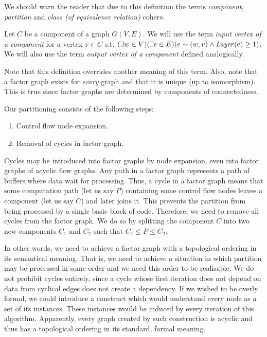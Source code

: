 \begin{rem} 
  We should warn the reader that due to this definition the terms \emph{component}, \emph{partition} and \emph{class (of equivalence relation)} cohere.
\end{rem}

  Let $C$ be a component of a graph $G(V,E)$. We will use the term \emph{input vertex of a component} for a vertex $v \in C$ s.t. $(\exists w \in V)(\exists e \in E)( e \sim (w,v) \land \mf{layer}(e) \geq 1 )$. We will also use the term \emph{output vertex of a component} defined analogically.
\myenddef

Note that this definition overrides another meaning of this term. Also, note that a factor graph exists for \emph{every} graph and that it is unique (up to isomorphism). This is true since factor graphs are determined by components of connectedness.

Our partitioning consists of the following steps:
\begin{enumerate}
  \item Control flow node expansion. 
  \item Removal of cycles in factor graph. 
\end{enumerate}

Cycles may be introduced into factor graphs by node expansion, even into factor graphs of acyclic flow graphs. Any path in a factor graph represents a path of buffers where data wait for processing. Thus, a cycle in a factor graph means that some computation path (let us say $P$) containing some control flow nodes leaves a component (let us say $C$) and later joins it. This prevents the partition from being processed by a single basic block of code. Therefore, we need to remove all cycles from the factor graph. We do so by splitting the component $C$ into two new components $C_1$ and $C_2$ such that $C_1 \leq P \leq C_2$.

In other words, we need to achieve a factor graph with a topological ordering in its semantical meaning. That is, we need to achieve a situation in which partition may be processed in some order and we need this order to be realisable. We do not prohibit cycles entirely, since a cycle whose first iteration does not depend on data from cyclical edges does not create a dependency. If we wished to be overly formal, we could introduce a construct which would understand every node as a set of its instances. These instances would be induced by every iteration of this algorithm. Apparently, every graph created by such construction is acyclic and thus has a topological ordering in its standard, formal meaning.

